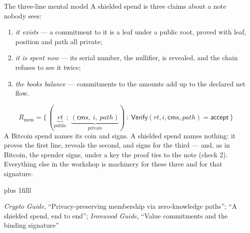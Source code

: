 \documentclass[aspectratio=169,11pt]{beamer}
\newcommand{\cmx}{\ensuremath{\mathsf{cmx}}}
\newcommand{\src}[1]{\par\vskip0pt plus 1filll
  {\fontsize{6}{7.2}\selectfont\color{arbdim}\raggedright #1\par}}
\begin{document}
\begin{frame}{The three-line mental model}
A shielded spend is three claims about a note nobody sees:
\begin{enumerate}
  \item \emph{it exists} --- a commitment to it is a leaf under a public
    root, proved with leaf, position and path all private;
  \item \emph{it is spent now} --- its serial number, the nullifier, is
    revealed, and the chain refuses to see it twice;
  \item \emph{the books balance} --- commitments to the amounts add up to
    the declared net flow.
\end{enumerate}
\[
R_{\mathrm{mem}} = \bigl\{\, (\underbrace{\mathit{rt}}_{\text{public}};\
  \underbrace{(\cmx,\ i,\ \mathit{path})}_{\text{private}}) \ :\
  \mathsf{Verify}(\mathit{rt}, i, \cmx, \mathit{path}) = \mathsf{accept}
  \,\bigr\}
\]
A Bitcoin spend names its coin and signs. A shielded spend names nothing:
it proves the first line, reveals the second, and signs for the third ---
and, as in Bitcoin, the spender signs, under a key the proof ties to the
note (check 2). Everything else in the workshop is machinery for these
three and for that signature.
\src{\emph{Crypto Guide}, ``Privacy-preserving membership via zero-knowledge
  paths''; ``A shielded spend, end to end''; \emph{Ironwood Guide},
  ``Value commitments and the binding signature''}
\end{frame}
\end{document}
